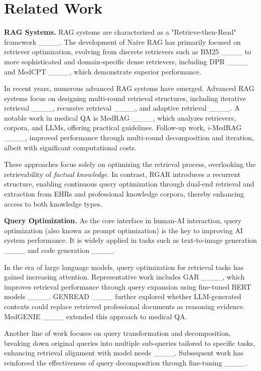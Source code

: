 \section{Related Work}
\textbf{RAG Systems. } RAG systems are characterized as a "Retrieve-then-Read" framework ____. The development of Naive RAG has primarily focused on retriever optimization, evolving from discrete retrievers such as BM25 ____ to more sophisticated and domain-specific dense retrievers, including DPR ____ and MedCPT ____, which demonstrate superior performance.

In recent years, numerous advanced RAG systems have emerged. Advanced RAG systems focus on designing multi-round retrieval structures, including iterative retrieval ____, recursive retrieval ____, and adaptive retrieval ____. A notable work in medical QA is MedRAG ____, which analyzes retrievers, corpora, and LLMs, offering practical guidelines. Follow-up work, $i$-MedRAG ____, improved performance through multi-round decomposition and iteration, albeit with significant computational costs.

These approaches focus solely on optimizing the retrieval process, overlooking the retrievability of \textit{factual knowledge}. In contrast, RGAR introduces a recurrent structure, enabling continuous query optimization through dual-end retrieval and extraction from EHRs and professional knowledge corpora, thereby enhancing access to both knowledge types.

\textbf{Query Optimization. } As the core interface in human-AI interaction, query optimization (also known as prompt optimization) is the key to improving AI system performance. It is widely applied in tasks such as text-to-image generation ____ and code generation ____.

In the era of large language models, query optimization for retrieval tasks has gained increasing attention. Representative work includes GAR ____, which improves retrieval performance through query expansion using fine-tuned BERT models ____. GENREAD ____ further explored whether LLM-generated contexts could replace retrieved professional documents as reasoning evidence. MedGENIE ____ extended this approach to medical QA.

Another line of work focuses on query transformation and decomposition, breaking down original queries into multiple sub-queries tailored to specific tasks, enhancing retrieval alignment with model needs ____. Subsequent work has reinforced the effectiveness of query decomposition through fine-tuning ____.

